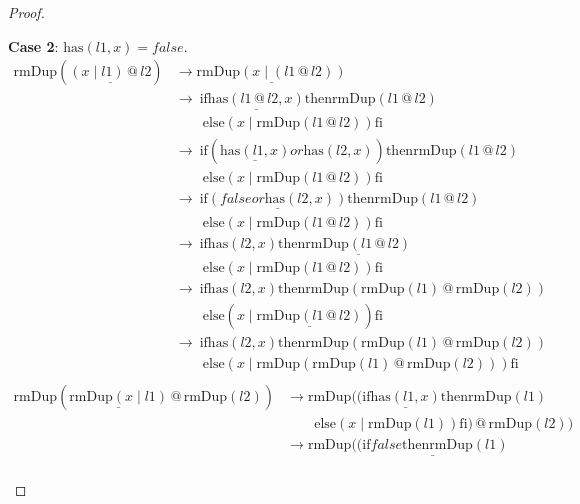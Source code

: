 \documentclass[12pt, a4paper]{article}
\newcommand{\rel}[1]{\mathrel{#1}}
\newcommand{\rmx}[1]{\mathrm{#1}}
\newcommand{\larrow}{\longrightarrow}
\newcommand{\under}{\underline}
\begin{document}
\begin{proof}
\begin{description}
\textbf{Case 2}: $\rmx{has}(l1, x) = false$.
\begin{align*}
\rmx{rmDup}(\under{(x \mid l1) \rel{@} l2})
	&\larrow \under{\rmx{rmDup}(x \mid (l1 \rel{@} l2))} \tag{by @2} \\
	&\larrow\ \rel{\rmx{if}} \under{\rmx{has}(l1 \rel{@} l2, x)} \rel{\rmx{then}} \rmx{rmDup}(l1 \rel{@} l2) \\
	&\quad \quad \rel{\rmx{else}} (x \mid \rmx{rmDup}(l1 \rel{@} l2)) \rel{\rmx{fi}} \tag{by rmDup2} \\
	&\larrow\ \rel{\rmx{if}} (\under{\rmx{has}(l1, x)} \rel{or} \rmx{has}(l2, x)) \rel{\rmx{then}} \rmx{rmDup}(l1 \rel{@} l2) \\
	&\quad \quad \rel{\rmx{else}} (x \mid \rmx{rmDup}(l1 \rel{@} l2)) \rel{\rmx{fi}} \tag{by Problem 6 - Lemma 1} \\
	&\larrow\ \rel{\rmx{if}} \under{(false \rel{or} \rmx{has}(l2, x))} \rel{\rmx{then}} \rmx{rmDup}(l1 \rel{@} l2) \\
	&\quad \quad \rel{\rmx{else}} (x \mid \rmx{rmDup}(l1 \rel{@} l2)) \rel{\rmx{fi}} \tag{by case splitting} \\
	&\larrow\ \rel{\rmx{if}} \rmx{has}(l2, x) \rel{\rmx{then}} \under{\rmx{rmDup}(l1 \rel{@} l2)} \\
	&\quad \quad \rel{\rmx{else}} (x \mid \rmx{rmDup}(l1 \rel{@} l2)) \rel{\rmx{fi}} \tag{by or} \\
	&\larrow\ \rel{\rmx{if}} \rmx{has}(l2, x) \rel{\rmx{then}} \rmx{rmDup}(\rmx{rmDup}(l1) \rel{@} \rmx{rmDup}(l2)) \\
	&\quad \quad \rel{\rmx{else}} (x \mid \under{\rmx{rmDup}(l1 \rel{@} l2)}) \rel{\rmx{fi}} \tag{by IH} \\
	&\larrow\ \rel{\rmx{if}} \rmx{has}(l2, x) \rel{\rmx{then}} \rmx{rmDup}(\rmx{rmDup}(l1) \rel{@} \rmx{rmDup}(l2)) \\
	&\quad \quad \rel{\rmx{else}} (x \mid \rmx{rmDup}(\rmx{rmDup}(l1) \rel{@} \rmx{rmDup}(l2))) \rel{\rmx{fi}} \tag{by IH} \\
\end{align*}
\begin{align*}
\rmx{rmDup}(\under{\rmx{rmDup}(x \mid l1)} \rel{@} \rmx{rmDup}(l2))
	&\larrow \rmx{rmDup}((\rel{\rmx{if}} \under{\rmx{has}(l1, x)} \rel{\rmx{then}} \rmx{rmDup}(l1) \\
	&\quad \quad \rel{\rmx{else}} (x \mid \rmx{rmDup}(l1)) \rel{\rmx{fi}}) \rel{@} \rmx{rmDup}(l2)) \tag{by rmDup2} \\
	&\larrow \rmx{rmDup}(\under{(\rel{\rmx{if}} false \rel{\rmx{then}} \rmx{rmDup}(l1)} \\

\end{align*}
\end{description}
\end{proof}
\end{document}
